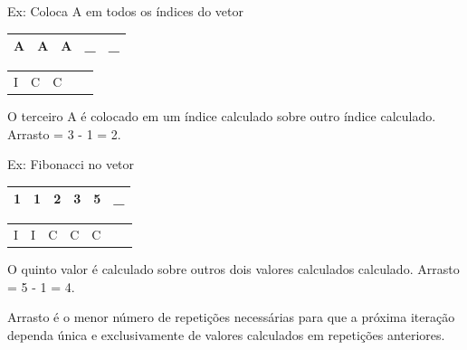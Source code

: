 \documentclass[
	12pt, %
]{fphw}
\begin{document}
\begin{doublespace}
\begin{enumerate}[label=\textbf{\arabic*)}]
\begin{itemize}
                        Ex: Coloca A em todos os índices do vetor

                        \begin{center}
                            \begin{tabular}{ | c | c | c | c | c | }
                                \hline
                                A & A & A & \_ & \_ \\
                                \hline
                            \end{tabular}

                            \begin{tabular}{ c c c c c }
                                I & C & C &  & \\
                            \end{tabular}
                        \end{center}

                        O terceiro A é colocado em um índice calculado sobre outro índice calculado. Arrasto = 3 - 1 = 2.

                        Ex: Fibonacci no vetor

                        \begin{center}
                            \begin{tabular}{ | c | c | c | c | c | c | }
                                \hline
                                1 & 1 & 2 & 3 & 5 & \_ \\
                                \hline
                            \end{tabular}

                            \begin{tabular}{ c c c c c c c }
                                I & I & C & C & C &  & \\
                            \end{tabular}
                        \end{center}

                        O quinto valor é calculado sobre outros dois valores calculados calculado. Arrasto = 5 - 1 = 4.

                        Arrasto é o menor número de repetições necessárias para que a próxima iteração dependa única e exclusivamente de valores calculados em repetições anteriores.

              \end{itemize}


\end{enumerate}
\end{doublespace}
\end{document}
